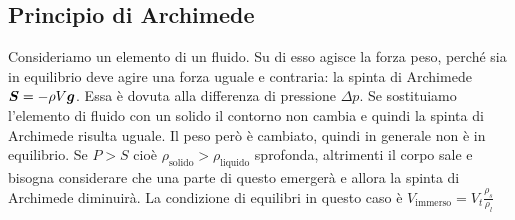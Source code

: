 \subsection{Principio di Archimede}
Consideriamo un elemento di un fluido. Su di esso agisce la forza peso, perché sia in equilibrio deve agire una forza uguale e contraria: la spinta di Archimede $\boldsymbol{S}=-\rho V\boldsymbol{g}$. Essa è dovuta alla differenza di pressione $\Delta p$. Se sostituiamo l'elemento di fluido con un solido il contorno non cambia e quindi la spinta di Archimede risulta uguale. Il peso però è cambiato, quindi in generale non è in equilibrio. Se $P>S$ cioè $\rho_\text{solido}>\rho_\text{liquido}$ sprofonda, altrimenti il corpo sale e bisogna considerare che una parte di questo emergerà e allora la spinta di Archimede diminuirà. La condizione di equilibri in questo caso è $V_\text{immerso}=V_t\frac{\rho_s}{\rho_l}$



